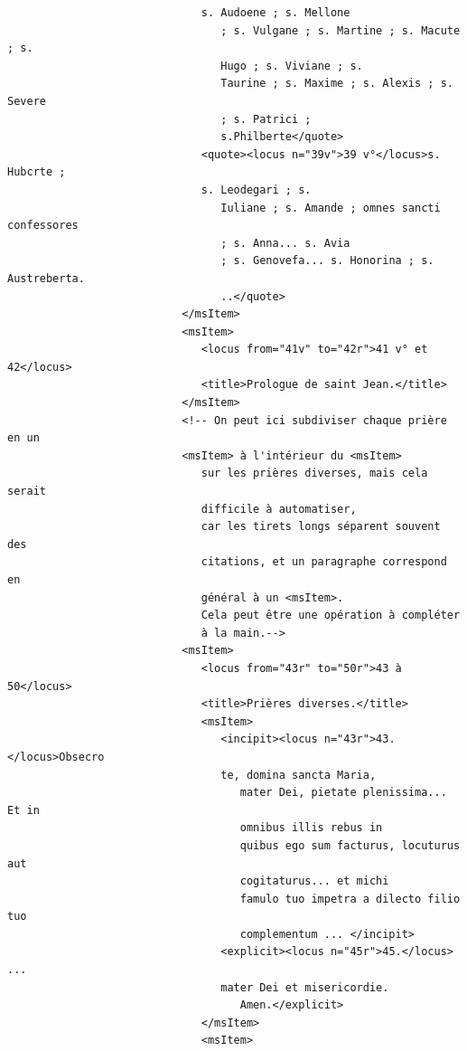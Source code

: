 \documentclass[a4paper,12pt,twoside]{book}
\begin{document}
\begin{verbatim}
                              s. Audoene ; s. Mellone
                                 ; s. Vulgane ; s. Martine ; s. Macute ; s.
                                 Hugo ; s. Viviane ; s.
                                 Taurine ; s. Maxime ; s. Alexis ; s. Severe 
                                 ; s. Patrici ;
                                 s.Philberte</quote>
                              <quote><locus n="39v">39 v°</locus>s. Hubcrte ;
                              s. Leodegari ; s.
                                 Iuliane ; s. Amande ; omnes sancti confessores 
                                 ; s. Anna... s. Avia
                                 ; s. Genovefa... s. Honorina ; s. Austreberta.
                                 ..</quote>
                           </msItem>
                           <msItem>
                              <locus from="41v" to="42r">41 v° et 42</locus>
                              <title>Prologue de saint Jean.</title>
                           </msItem>
                           <!-- On peut ici subdiviser chaque prière en un
                           <msItem> à l'intérieur du <msItem> 
                              sur les prières diverses, mais cela serait 
                              difficile à automatiser, 
                              car les tirets longs séparent souvent des 
                              citations, et un paragraphe correspond en 
                              général à un <msItem>. 
                              Cela peut être une opération à compléter 
                              à la main.-->
                           <msItem>
                              <locus from="43r" to="50r">43 à 50</locus>
                              <title>Prières diverses.</title>
                              <msItem>
                                 <incipit><locus n="43r">43.</locus>Obsecro
                                 te, domina sancta Maria,
                                    mater Dei, pietate plenissima... Et in
                                    omnibus illis rebus in
                                    quibus ego sum facturus, locuturus aut 
                                    cogitaturus... et michi
                                    famulo tuo impetra a dilecto filio tuo 
                                    complementum ... </incipit>
                                 <explicit><locus n="45r">45.</locus> ...
                                 mater Dei et misericordie.
                                    Amen.</explicit>
                              </msItem>
                              <msItem>

\end{verbatim}
\end{document}
